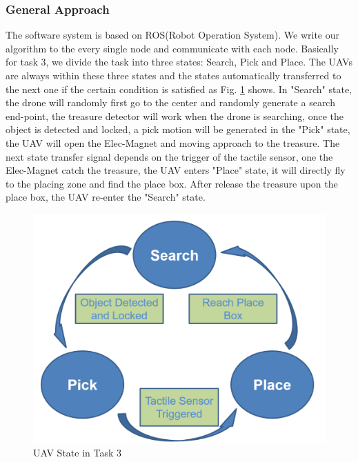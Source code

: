 \documentclass{standalone}
\begin{document}
\subsubsection{General Approach}
The software system is based on ROS(Robot Operation System). We write our algorithm to the every single node and communicate with each node. Basically for task 3, we divide the task into three states: Search, Pick and Place. The UAVs are always within these three states and the states automatically transferred to the next one if the certain condition is satisfied as Fig. \ref{t3state} shows. In "Search" state, the drone will randomly first go to the center and randomly generate a search end-point, the treasure detector will work when the drone is searching, once the object is detected and locked, a pick motion will be generated in the "Pick" state, the UAV will open the Elec-Magnet and moving approach to the treasure. The next state transfer signal depends on the trigger of the tactile sensor, one the Elec-Magnet catch the treasure, the UAV enters "Place" state, it will directly fly to the placing zone and find the place box. After release the treasure upon the place box, the UAV re-enter the "Search" state.
 \begin{figure}%
    \begin{center}
      \includegraphics[keepaspectratio=true, width=1\linewidth, height=0.20\textheight]{img//task3state.png}
    \end{center}
    \caption{UAV State in Task 3}
    \label{t3state}
  \end{figure}
\end{document}
